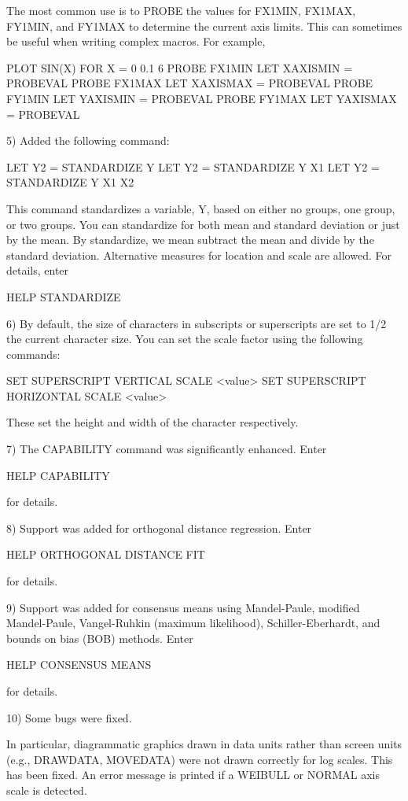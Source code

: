 {    The most common use is to PROBE the values for FX1MIN,
    FX1MAX, FY1MIN, and FY1MAX to determine the current
    axis limits.  This can sometimes be useful when writing
    complex macros.  For example,

       PLOT SIN(X) FOR X = 0 0.1 6
       PROBE FX1MIN
       LET XAXISMIN = PROBEVAL
       PROBE FX1MAX
       LET XAXISMAX = PROBEVAL
       PROBE FY1MIN
       LET YAXISMIN = PROBEVAL
       PROBE FY1MAX
       LET YAXISMAX = PROBEVAL

 5) Added the following command:

      LET Y2 = STANDARDIZE Y
      LET Y2 = STANDARDIZE Y X1
      LET Y2 = STANDARDIZE Y X1 X2

    This command standardizes a variable, Y, based on either
    no groups, one group, or two groups.  You can standardize
    for both mean and standard deviation or just by the mean.
    By standardize, we mean subtract the mean and divide by the
    standard deviation.  Alternative measures for location and
    scale are allowed.  For details, enter

       HELP STANDARDIZE

 6) By default, the size of characters in subscripts or superscripts
    are set to 1/2 the current character size.  You can set the
    scale factor using the following commands:

      SET SUPERSCRIPT VERTICAL SCALE <value>
      SET SUPERSCRIPT HORIZONTAL SCALE <value>

    These set the height and width of the character respectively.

 7) The CAPABILITY command was significantly enhanced.  Enter
    
        HELP CAPABILITY

    for details.

 8) Support was added for orthogonal distance regression.  Enter

        HELP ORTHOGONAL DISTANCE FIT

    for details.
    
 9) Support was added for consensus means using Mandel-Paule,
    modified Mandel-Paule, Vangel-Ruhkin (maximum likelihood),
    Schiller-Eberhardt, and bounds on bias (BOB) methods.  Enter

        HELP CONSENSUS MEANS

    for details.
    
10) Some bugs were fixed.

    In particular, diagrammatic graphics drawn in data units rather
    than screen units (e.g., DRAWDATA, MOVEDATA) were not drawn
    correctly for log scales.  This has been fixed.  An error
    message is printed if a WEIBULL or NORMAL axis scale is detected.

}
